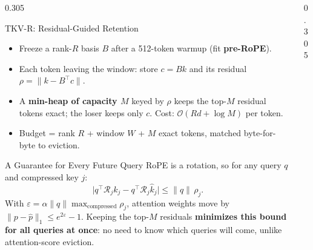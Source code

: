 \documentclass[final]{beamer}
\begin{document}
\begin{frame}[t]
\begin{columns}[t]
\begin{column}{0.305\paperwidth}
\begin{block}{TKV-R: Residual-Guided Retention}
\begin{center}
\end{center}
\vspace{0.2cm}
\begin{itemize}
  \item Freeze a rank-$R$ basis $B$ after a 512-token warmup (fit \textbf{pre-RoPE}).
  \item Each token leaving the window: store $c = Bk$ and its residual $\rho = \lVert k - B^\top c\rVert$.
  \item A \textbf{min-heap of capacity $M$} keyed by $\rho$ keeps the top-$M$ residual tokens exact; the loser keeps only $c$. Cost: $\mathcal{O}(Rd + \log M)$ per token.
  \item Budget = rank $R$ + window $W$ + $M$ exact tokens, matched byte-for-byte to eviction.
\end{itemize}
\end{block}

\begin{block}{A Guarantee for Every Future Query}
RoPE is a rotation, so for any query $q$ and compressed key $j$:
\[
\bigl|q^\top \mathcal{R}_j k_j - q^\top \mathcal{R}_j \hat k_j\bigr| \le \lVert q\rVert\,\rho_j .
\]
With $\varepsilon = \alpha\lVert q\rVert\max_{\text{compressed}}\rho_j$, attention weights move by
$\lVert p - \hat p\rVert_1 \le e^{2\varepsilon} - 1$. Keeping the top-$M$ residuals
\textbf{minimizes this bound for all queries at once}: no need to know which
queries will come, unlike attention-score eviction.
\end{block}

\end{column}

\begin{column}{0.305\paperwidth}


\end{column}
\end{columns}
\end{frame}
\end{document}
